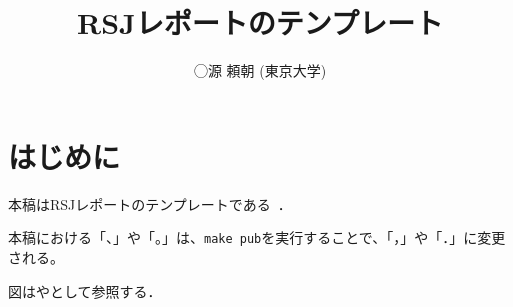 \documentclass{jarticle}
\begin{document}
\title{RSJレポートのテンプレート}
\author{◯源 頼朝 (東京大学)}

\setlength{\baselineskip}{4.4mm}
\maketitle
\thispagestyle{empty}
\pagestyle{empty}

\section{はじめに}

本稿はRSJレポートのテンプレートである~\cite{Sakai}．

本稿における「、」や「。」は、\verb|make pub|を実行することで、「，」や「．」に変更される。

図はやとして参照する．
\end{document}

